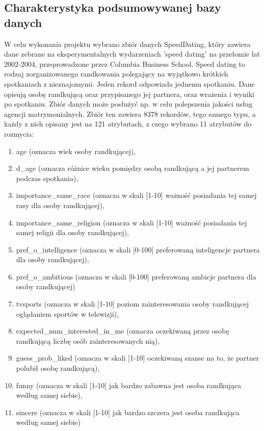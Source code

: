 \documentclass{classrep}
\begin{document}
\subsection{Charakterystyka podsumowywanej bazy danych}

W celu wykonania projektu wybrano zbiór danych SpeedDating\cite{database}, który zawiera dane zebrane na eksperymentalnych wydarzeniach 'speed dating' na przełomie lat 2002-2004, przeprowadzone przez Columbia Business School. 
Speed dating to rodzaj zorganizowanego randkowania polegający na wyjątkowo krótkich spotkaniach z nieznajomymi. Jeden rekord odpowiada jednemu spotkaniu. Dane opisują osobę randkującą oraz przypisanego jej partnera, oraz wrażenia i wyniki po spotkaniu. 
Zbiór danych może posłużyć np. w celu polepszenia jakości usług agencji matrymonialnych.
Zbiór ten zawiera 8378 rekordów, tego samego typu, a każdy z nich opisany jest na 121 atrybutach, z czego wybrano 11 atrybutów do rozmycia:
\begin{enumerate}
  \item age (oznacza wiek osoby randkującej),
  \item d\_age (oznacza różnice wieku pomiędzy osobą randkującą a jej partnerem podczas spotkania),
  \item importance\_same\_race (oznacza w skali [1-10] ważność posiadania tej samej rasy dla osoby randkującej), 
  \item importance\_same\_religion (oznacza w skali [1-10] ważność posiadania tej samej religii dla osoby randkującej), 
  \item pref\_o\_intelligence (oznacza w skali [0-100] preferowaną inteligencje partnera dla osoby randkującej),
  \item pref\_o\_ambitious (oznacza w skali [0-100] preferowaną ambicje partnera dla osoby randkującej)
  \item tvsports (oznacza w skali [1-10] poziom zainteresowania osoby randkującej oglądaniem sportów w telewizji),
  \item expected\_num\_interested\_in\_me (oznacza oczekiwaną przez osobę randkującą liczbę osób zainteresowanych nią),
  \item guess\_prob\_liked (oznacza w skali [1-10] oczekiwaną szanse na to, że partner polubił osobę randkującą),
  \item funny (oznacza w skali [1-10] jak bardzo zabawna jest osoba randkująca według samej siebie),
  \item sincere (oznacza w skali [1-10] jak bardzo szczera jest osoba randkująca według samej siebie)
\end{enumerate}
\end{document}
